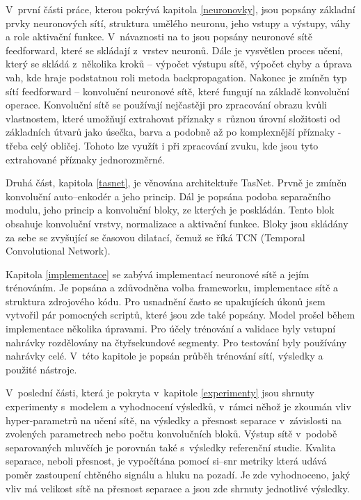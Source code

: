 V~první části práce, kterou pokrývá kapitola \ref{neuronovky}, jsou popsány základní prvky neuronových sítí, struktura umělého neuronu, jeho vstupy a výstupy, váhy a role aktivační funkce. V~návaznosti na to jsou popsány neuronové sítě feedforward, které se skládají z~vrstev neuronů. Dále je vysvětlen proces učení, který se skládá z~několika kroků -- výpočet výstupu sítě, výpočet chyby a úprava vah, kde hraje podstatnou roli metoda backpropagation. Nakonec je zmíněn typ sítí feedforward -- konvoluční neuronové sítě, které fungují na základě konvoluční operace. Konvoluční sítě se používají nejčastěji pro zpracování obrazu kvůli vlastnostem, které umožňují extrahovat příznaky s~různou úrovní složitosti od základních útvarů jako úsečka, barva a podobně až po komplexnější příznaky - třeba celý obličej. Tohoto lze využít i při zpracování zvuku, kde jsou tyto extrahované příznaky jednorozměrné.

Druhá část, kapitola \ref{tasnet}, je věnována architektuře TasNet. Prvně je zmíněn konvoluční auto--enkodér a jeho princip. Dál je popsána podoba separačního modulu, jeho princip a konvoluční bloky, ze kterých je poskládán. Tento blok obsahuje konvoluční vrstvy, normalizace a aktivační funkce. Bloky jsou skládány za sebe se zvyšující se časovou dilatací, čemuž se říká TCN (Temporal Convolutional Network). 

Kapitola \ref{implementace} se zabývá implementací neuronové sítě a jejím trénováním. Je popsána a zdůvodněna volba frameworku, implementace sítě a struktura zdrojového kódu. Pro usnadnění často se upakujících úkonů jsem vytvořil pár pomocných scriptů, které jsou zde také popsány. 
Model prošel během implementace několika úpravami. Pro účely trénování a validace byly vstupní nahrávky rozdělovány na čtyřsekundové segmenty. Pro testování byly používány nahrávky celé. V~této kapitole je popsán průběh trénování sítí, výsledky a použité nástroje.

V~poslední části, která je pokryta v~kapitole \ref{experimenty} jsou shrnuty experimenty s~modelem a vyhodnocení výsledků, v~rámci něhož je zkoumán vliv hyper-parametrů na učení sítě, na výsledky a přesnost separace v~závislosti na zvolených parametrech nebo počtu konvolučních bloků. Výstup sítě v~podobě separovaných mluvčích je porovnán také s~výsledky referenční studie. Kvalita separace, neboli přesnost, je vypočítána pomocí si--snr metriky která udává poměr zastoupení chtěného signálu a hluku na pozadí. Je zde vyhodnoceno, jaký vliv má velikost sítě na přesnost separace a jsou zde shrnuty jednotlivé výsledky.




